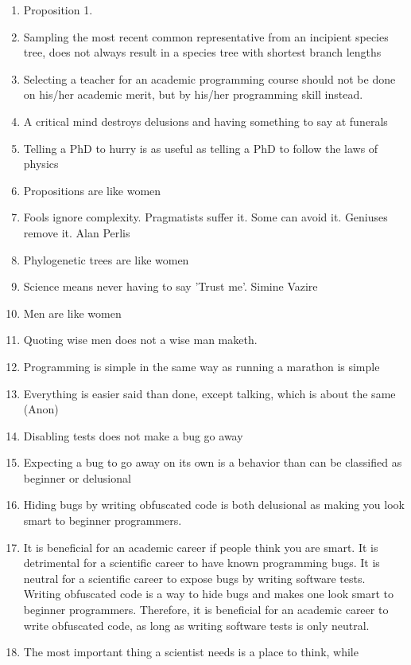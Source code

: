 \documentclass{dissertation}
\begin{document}
\begin{enumerate}

\item Proposition 1.
\item Sampling the most recent common representative from an incipient
  species tree, does not always result in a species tree with shortest
  branch lengths
\item Selecting a teacher for an academic programming course should not be done on his/her academic merit, but by his/her programming skill instead.
\item A critical mind destroys delusions and having something to say at funerals
\item Telling a PhD to hurry is as useful as telling a PhD to follow the laws of physics
\item Propositions are like women
\item Fools ignore complexity. Pragmatists suffer it. Some can avoid it. Geniuses remove it. Alan Perlis
\item Phylogenetic trees are like women
\item Science means never having to say 'Trust me'. Simine Vazire 
\item Men are like women
\item Quoting wise men does not a wise man maketh.
\item Programming is simple in the same way as running a marathon is simple
\item Everything is easier said than done, except talking, which is about the same (Anon)
\item Disabling tests does not make a bug go away
\item Expecting a bug to go away on its own is a behavior than can be classified as beginner or delusional
\item Hiding bugs by writing obfuscated code is both delusional as making you look smart to beginner programmers. 
\item It is beneficial for an academic career if people think you are smart.
      It is detrimental for a scientific career to have known programming bugs.
      It is neutral for a scientific career to expose bugs by writing software tests.
      Writing obfuscated code is a way to hide bugs and makes one look smart to beginner programmers.
      Therefore, it is beneficial for an academic career to write obfuscated code,
      as long as writing software tests is only neutral.
\item The most important thing a scientist needs is a place to think, while

\end{enumerate}
\end{document}

